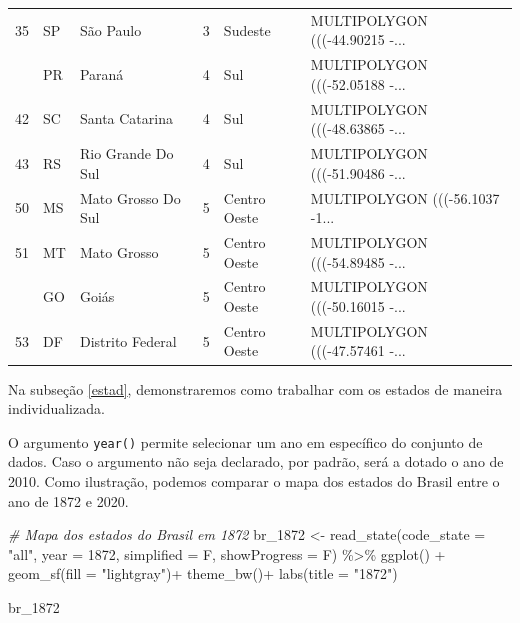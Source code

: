 \documentclass[
  brazilian,
]{book}
\newenvironment{Shaded}{\begin{snugshade}}{\end{snugshade}}
\newcommand{\AttributeTok}[1]{\textcolor[rgb]{0.77,0.63,0.00}{#1}}
\newcommand{\CommentTok}[1]{\textcolor[rgb]{0.56,0.35,0.01}{\textit{#1}}}
\newcommand{\DecValTok}[1]{\textcolor[rgb]{0.00,0.00,0.81}{#1}}
\newcommand{\FunctionTok}[1]{\textcolor[rgb]{0.00,0.00,0.00}{#1}}
\newcommand{\NormalTok}[1]{#1}
\newcommand{\OtherTok}[1]{\textcolor[rgb]{0.56,0.35,0.01}{#1}}
\newcommand{\SpecialCharTok}[1]{\textcolor[rgb]{0.00,0.00,0.00}{#1}}
\newcommand{\StringTok}[1]{\textcolor[rgb]{0.31,0.60,0.02}{#1}}
\begin{document}
\begin{longtable}{rllrll}
35 & SP & São Paulo & 3 & Sudeste & MULTIPOLYGON (((-44.90215 -...\\
\addlinespace
41 & PR & Paraná & 4 & Sul & MULTIPOLYGON (((-52.05188 -...\\
42 & SC & Santa Catarina & 4 & Sul & MULTIPOLYGON (((-48.63865 -...\\
43 & RS & Rio Grande Do Sul & 4 & Sul & MULTIPOLYGON (((-51.90486 -...\\
50 & MS & Mato Grosso Do Sul & 5 & Centro Oeste & MULTIPOLYGON (((-56.1037 -1...\\
51 & MT & Mato Grosso & 5 & Centro Oeste & MULTIPOLYGON (((-54.89485 -...\\
\addlinespace
52 & GO & Goiás & 5 & Centro Oeste & MULTIPOLYGON (((-50.16015 -...\\
53 & DF & Distrito Federal & 5 & Centro Oeste & MULTIPOLYGON (((-47.57461 -...\\*
\end{longtable}
\endgroup{}

Na subseção \ref{estad}, demonstraremos como trabalhar com os estados de maneira individualizada.

O argumento \texttt{year()} permite selecionar um ano em específico do conjunto de dados. Caso o argumento não seja declarado, por padrão, será a dotado o ano de 2010. Como ilustração, podemos comparar o mapa dos estados do Brasil entre o ano de 1872 e 2020.

\begin{Shaded}
\begin{Highlighting}[]
\CommentTok{\# Mapa dos estados do Brasil em 1872}
\NormalTok{br\_1872 }\OtherTok{\textless{}{-}} \FunctionTok{read\_state}\NormalTok{(}\AttributeTok{code\_state =} \StringTok{"all"}\NormalTok{,}
                      \AttributeTok{year =} \DecValTok{1872}\NormalTok{,}
                      \AttributeTok{simplified =}\NormalTok{ F,}
                      \AttributeTok{showProgress =}\NormalTok{ F) }\SpecialCharTok{\%\textgreater{}\%}
  \FunctionTok{ggplot}\NormalTok{() }\SpecialCharTok{+} 
  \FunctionTok{geom\_sf}\NormalTok{(}\AttributeTok{fill =} \StringTok{"lightgray"}\NormalTok{)}\SpecialCharTok{+}
  \FunctionTok{theme\_bw}\NormalTok{()}\SpecialCharTok{+}
  \FunctionTok{labs}\NormalTok{(}\AttributeTok{title =} \StringTok{"1872"}\NormalTok{)}

\NormalTok{br\_1872}
\end{Highlighting}
\end{Shaded}
\end{document}
